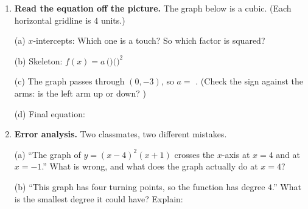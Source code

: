 \documentclass[10pt]{article}
\newcommand{\lgrid}[4]{%
  \draw[step=1, linegray!40, very thin] (#1,#3) grid (#2,#4);
  \draw[->, semithick, charcoal] (#1,0)--(#2,0) node[below right, font=\scriptsize]{$x$};
  \draw[->, semithick, charcoal] (0,#3)--(0,#4) node[left, font=\scriptsize]{$y$};}
\begin{document}
\begin{tcolorbox}[colback=white, colframe=black!40, title=\textbf{Tier A --- Approaching Proficiency},
    fonttitle=\bfseries, arc=1.5mm, left=3mm, right=3mm, top=2mm, bottom=2mm, breakable]
\begin{enumerate}[leftmargin=1.7em, itemsep=10pt]
    \vspace{2pt}
    (f) From the graph: \textbf{domain} \blank{2.4cm}, \textbf{range} \blank{2.4cm}. \;
    Relative maximum near $x\approx$ \blank{1.0cm}, relative minimum near $x\approx$ \blank{1.0cm}.

    \vspace{2pt}
    (g) Does this function have an \emph{absolute} maximum or minimum? \blank{1.2cm} \; Explain using
    the degree: \blank{5.0cm}

  \item \textbf{Read the equation off the picture.} The graph below is a cubic.
    (Each horizontal gridline is $4$ units.)
    \begin{center}
    \end{center}

    \vspace{2pt}
    (a) $x$-intercepts: \blank{2.6cm} \; Which one is a touch? \blank{1.4cm} \; So which factor is
    squared? \blank{2.0cm}

    \vspace{2pt}
    (b) Skeleton: $f(x) = a\,($\blank{1.6cm}$)($\blank{1.8cm}$)^2$

    \vspace{2pt}
    (c) The graph passes through $(0,-3)$, so $a = $ \blank{1.2cm}. \; (Check the sign against the
    arms: is the left arm up or down? \blank{1.4cm})

    \vspace{2pt}
    (d) Final equation: \blank{5.0cm}

  \item \textbf{Error analysis.} Two classmates, two different mistakes.

    \vspace{2pt}
    (a) ``The graph of $y=(x-4)^2(x+1)$ crosses the $x$-axis at $x=4$ and at $x=-1$.''
    What is wrong, and what does the graph actually do at $x=4$? \blank{5.6cm}

    \vspace{2pt}
    (b) ``This graph has four turning points, so the function has degree $4$.''
    What is the smallest degree it could have? \blank{1.2cm} \; Explain: \blank{5.0cm}
\end{enumerate}
\end{tcolorbox}
\end{document}
